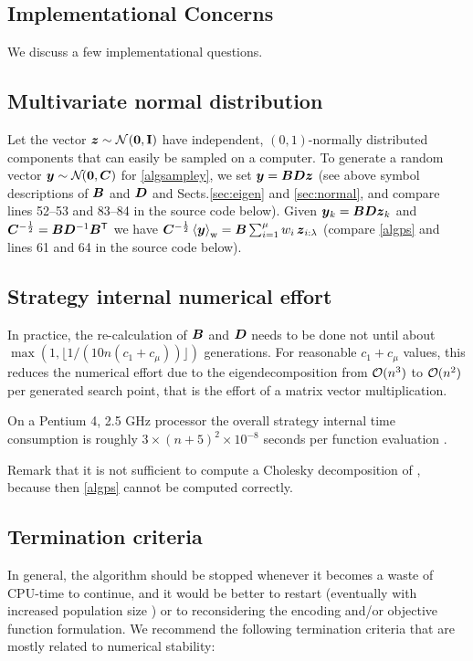 \documentclass{article} %
\newcommand{\ve}[1]{\mathchoice{\mbox{\boldmath$\displaystyle#1$}}
  {\mbox{\boldmath$\textstyle#1$}} {\mbox{\boldmath$\scriptstyle#1$}}
  {\mbox{\boldmath$\scriptscriptstyle#1$}}}
\newcommand{\T}{\ensuremath{\mathsf{T}}}
\newcommand{\mal}{\cdot}
\newcommand{\N}{\ensuremath{n}}
\newcommand{\summ}[2]{\sum_{#1=1}^{#2}}
\newcommand{\lam}{\ensuremath{\lambda}}
\newcommand{\y}{\ve{y}}
\newcommand{\z}{\ve{z}}
\newcommand{\ilam}{{i:\lam}}
\newcommand{\Id}{\mathbf{I}}
\newcommand{\NormalNullI}{{\mathcal N}
        \hspace{-0.13em}\left({\ve{0},\Id}\right)}
\newcommand{\textNormal}[1]{\mathcal{N}\hspace{-0.13em}(#1)}
\newcommand{\cone}{\ensuremath{c_1}}
\newcommand{\cmu}{\ensuremath{c_\mu}}
\renewcommand{\mal}{\times}
\newcommand{\pref}[1]{\mbox{.\hspace{0.235em}\ref{#1}}}
\begin{document}
\begin{appendix}
\section{Implementational Concerns}
\newcommand{\offset}{f_{\mathrm{offset}}}
\newcommand{\alphaf}{\alpha_{f}}
\newcommand{\alphac}{\alpha_{c}}
We discuss a few implementational questions. 
  \subsection{Multivariate normal distribution} \begin{sloppypar} Let the
  vector $\z\sim\NormalNullI$ have independent, $(0,1)$-normally
  distributed components that can easily be sampled on a computer.  To
  generate a random vector $\y\sim\textNormal{\ve{0},\linebreak[0]\C}$
  for \eqref{algsampley}, we set $\y=\B\D\z$ (see above symbol
  descriptions of $\B$ and $\D$ and Sects\pref{sec:eigen} and
  \ref{sec:normal}, and compare lines 52--53 and 83--84 in the source
  code below).  Given $\y_k=\B\D\z_k$ and
  $\C^{-\frac{1}{2}}=\B\D^{-1}\B^\T$ we have
  $\C^{-\frac{1}{2}}\ymean=\B\summ{i}{\mu}w_i\,\z_\ilam$ (compare
  \eqref{algps} and lines 61 and 64 in the source code below).
 \end{sloppypar}
 
\subsection{Strategy internal numerical effort} In practice, the
  re-calculation of $\B$ and $\D$ needs to be done not until about
  $\max(1,\lfloor 1/(10\N(\cone+\cmu))\rfloor)$ generations. For reasonable
  $\cone+\cmu$ values, this reduces the numerical effort due to the
  eigendecomposition from ${\cal O}(\N^3)$ to ${\cal O}(\N^2)$ per
  generated search point, that is the effort of a matrix vector
  multiplication.

On a Pentium 4, 2.5 GHz processor
  the overall strategy internal time consumption is roughly
  $3\mal (\N+5)^2\mal 10^{-8}$ seconds per function evaluation
  \cite{Kern:2004}.

Remark that it is not sufficient to compute a Cholesky decomposition
of \C, because then \eqref{algps} cannot be computed correctly. 

\subsection{Termination criteria} 
  In general, the algorithm should be stopped whenever it becomes a
  waste of CPU-time to continue, and it would be better to restart
  (eventually with increased population size \cite{Auger:2005a}) or to
  reconsidering the encoding and/or objective function formulation. We
  recommend the following termination criteria \cite{Auger:2005a,Hansen:2009} that
  are mostly related to numerical stability:


\end{appendix}
\end{document}

